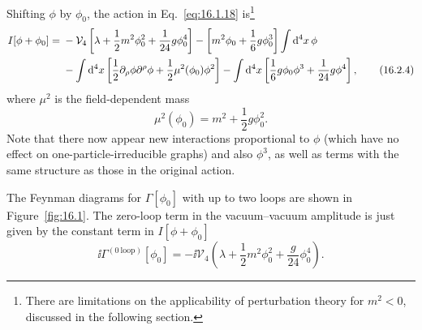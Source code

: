 Shifting $\phi$ by $\phi_0$, the action in Eq.~\eqref{eq:16.1.18} is\footnote{There are limitations on the applicability of perturbation theory for $m^2<0$, discussed in the following section.}
\begin{align}
 I[\phi+\phi_0] ={}& -\mathcal{V}_4\left[\lambda+\frac{1}{2}m^2\phi_0^2+\frac{1}{24}g\phi_0^4\right]
 -\left[m^2\phi_0+\frac{1}{6}g\phi_0^3\right]\int \mathop{}\!\mathrm{d}^4x\,\phi \notag\\
 &-\int \mathop{}\!\mathrm{d}^4x\left[\frac{1}{2}\partial_\rho\phi\partial^\rho\phi
 +\frac{1}{2}\mu^2(\phi_0)\phi^2\right]
 -\int \mathop{}\!\mathrm{d}^4x\left[\frac{1}{6}g\phi_0\phi^3+\frac{1}{24}g\phi^4\right] ,
 \tag{16.2.4}
 \label{eq:16.2.4}
\end{align}
where $\mu^2$ is the field-dependent mass
\begin{equation}
 \mu^2(\phi_0) = m^2+\frac{1}{2}g\phi_0^2 .
 \tag{16.2.5}
 \label{eq:16.2.5}
\end{equation}
Note that there now appear new interactions proportional to $\phi$ (which
have no effect on one-particle-irreducible graphs) and also $\phi^3$, as well as
terms with the same structure as those in the original action.

The Feynman diagrams for $\Gamma[\phi_0]$ with up to two loops are shown in
Figure~\ref{fig:16.1}. The zero-loop term in the vacuum--vacuum amplitude is just
given by the constant term in $I[\phi+\phi_0]$
\begin{equation}
 \ii\Gamma^{(0\ \mathrm{loop})}[\phi_0]
 = -\ii\mathcal{V}_4\left(\lambda+\frac{1}{2}m^2\phi_0^2+\frac{g}{24}\phi_0^4\right) .
 \tag{16.2.6}
 \label{eq:16.2.6}
\end{equation}

